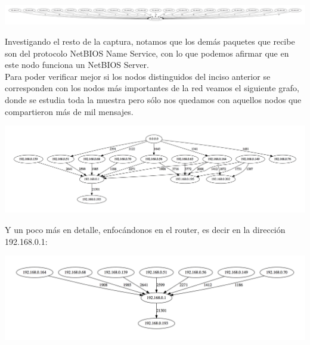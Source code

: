 \includegraphics[scale=0.25,clip=true,trim=700 0 720 0]{graphics/t-work-ip-169-254-255-255.png}

\indent Investigando el resto de la captura, notamos que los demás paquetes que recibe son del protocolo NetBIOS Name Service, con lo que podemos afirmar que en este nodo funciona un NetBIOS Server.\\
\indent Para poder verificar mejor si los nodos distinguidos del inciso anterior se corresponden con los nodos más importantes de la red veamos el siguiente grafo, donde se estudia toda la muestra pero sólo nos quedamos con aquellos nodos que compartieron más de mil mensajes.\newline

\includegraphics[scale=0.30]{graphics/t-work-all-1000w.png}

\indent Y un poco más en detalle, enfocándonos en el router, es decir en la dirección 192.168.0.1:\\

\begin{center}
\includegraphics[scale=0.3]{graphics/t-work-router-1000w.png}
\end{center}

